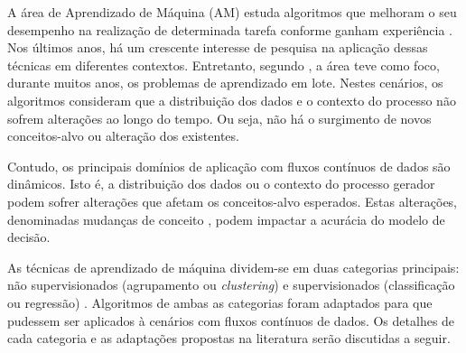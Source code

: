 \documentclass[qual, classic, a4paper]{ufbathesis}
\begin{document}


A área de Aprendizado de Máquina (AM) estuda algoritmos que melhoram o seu desempenho na realização de determinada tarefa conforme ganham experiência \cite{Mitchell:1997:ML:541177}.
Nos últimos anos, há um crescente interesse de pesquisa na aplicação dessas técnicas em diferentes contextos.
Entretanto, segundo \cite{Gama:2010:KDD:1855075}, a área teve como foco, durante muitos anos, os problemas de aprendizado em lote.
Nestes cenários, os algoritmos consideram que a distribuição dos dados e o contexto do processo não sofrem alterações ao longo do tempo.
Ou seja, não há o surgimento de novos conceitos-alvo ou alteração dos existentes.

Contudo, os principais domínios de aplicação com fluxos contínuos de dados são dinâmicos.
Isto é, a distribuição dos dados ou o contexto do processo gerador podem sofrer alterações que afetam os conceitos-alvo esperados.
Estas alterações, denominadas mudanças de conceito \cite{Gama:2010:KDD:1855075}, podem impactar a acurácia do modelo de decisão.



As técnicas de aprendizado de máquina dividem-se em duas categorias principais: 
não supervisionados (agrupamento ou \textit{clustering}) e supervisionados (classificação ou regressão) \cite{Mitchell:1997:ML:541177}.
Algoritmos de ambas as categorias foram adaptados para que pudessem ser aplicados à cenários com fluxos contínuos de dados.
Os detalhes de cada categoria e as adaptações propostas na literatura serão discutidas a seguir.
\end{document}
